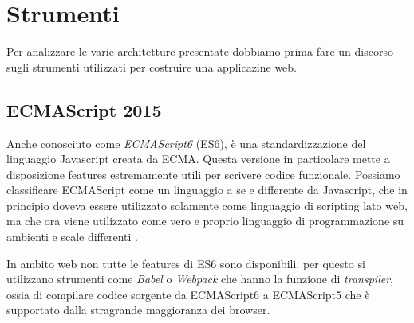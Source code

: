 \chapter{Strumenti}
Per analizzare le varie architetture presentate dobbiamo prima fare un discorso sugli strumenti utilizzati per costruire una applicazine web.

\section{ECMAScript 2015}
Anche conosciuto come \textit{ECMAScript6} (ES6), è una standardizzazione del linguaggio Javascript creata da ECMA. Questa versione in particolare mette a disposizione features estremamente utili per scrivere codice funzionale. Possiamo classificare ECMAScript come un linguaggio a se e differente da Javascript, che in principio doveva essere utilizzato solamente come linguaggio di scripting lato web, ma che ora viene utilizzato come vero e proprio linguaggio di programmazione su ambienti e scale differenti \cite{ECMAScriptDocumentation}.

In ambito web non tutte le features di ES6 sono disponibili, per questo si utilizzano strumenti come \textit{Babel} o \textit{Webpack} che hanno la funzione di \textit{transpiler}, ossia di compilare codice sorgente da ECMAScript6 a ECMAScript5 che è supportato dalla stragrande maggioranza dei browser.

